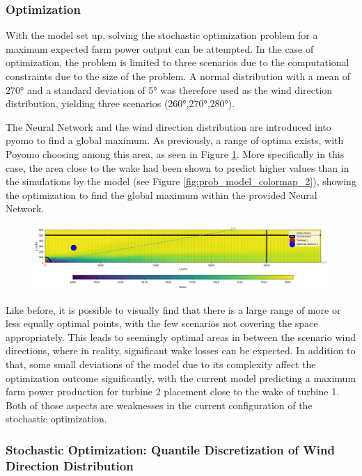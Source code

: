 \subsubsection{Optimization}

With the model set up, solving the stochastic optimization problem for a maximum expected farm power output can be attempted. In the case of optimization, the problem is limited to three scenarios due to the computational constraints due to the size of the problem. A normal distribution with a mean of 270° and  a standard deviation of 5° was therefore used as the wind direction distribution, yielding three scenarios (260°,270°,280°).

The Neural Network and the wind direction distribution are introduced into pyomo to find a global maximum. As previously, a range of optima exists, with Poyomo choosing among this area, as seen in Figure \ref{fig:prob_data_lininter}. More specifically in this case, the area close to the wake had been shown to predict higher values than in the simulations by the model (see Figure \ref{fig:prob_model_colormap_2}), showing the optimization to find the global maximum within the provided Neural Network. 

\begin{figure}[h] 
	\centering
	\includegraphics[width=1\textwidth]{figures/optimization/prob_data_lininter.png} 
	\caption{}
	\label{fig:prob_data_lininter}
\end{figure}

Like before, it is possible to visually find that there is a large range of more or less equally optimal points, with the few scenarios not covering the space appropriately. This leads to seemingly optimal areas in between the scenario wind directions, where in reality, significant wake losses can be expected. In addition to that, some small deviations of the model due to its complexity affect the optimization outcome significantly, with the current model predicting a maximum farm power production for turbine 2 placement close to the wake of turbine 1. Both of those aspects are weaknesses in the current configuration of the stochastic optimization.
	
\subsubsection{Stochastic Optimization: Quantile Discretization of Wind Direction Distribution } \label{subsubsection: discretization}

